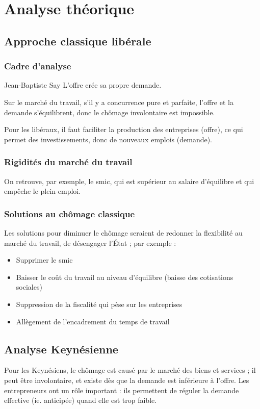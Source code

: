 \documentclass[10pt,a4paper,french]{article}
\begin{document}
\section{Analyse théorique}

\subsection{Approche classique libérale}

\subsubsection{Cadre d'analyse}
\begin{cquote}{Jean-Baptiste Say}
L'offre crée sa propre demande.
\end{cquote}

Sur le marché du travail, s'il y a concurrence pure et parfaite, l'offre et la demande s'équilibrent, donc le chômage involontaire est impossible.

Pour les libéraux, il faut faciliter la production des entreprises (offre), ce qui permet des investissements, donc de nouveaux emplois (demande).

\subsubsection{Rigidités du marché du travail}
On retrouve, par exemple, le \gls{smic}, qui est supérieur au salaire d'équilibre et qui empêche le plein-emploi.

\subsubsection{Solutions au chômage classique}
Les solutions pour diminuer le chômage seraient de redonner la flexibilité au marché du travail, de désengager l’État ; par exemple :
\begin{itemize}
\item Supprimer le \gls{smic}
\item Baisser le coût du travail au niveau d'équilibre (baisse des cotisations sociales)
\item Suppression de la fiscalité qui pèse sur les entreprises
\item Allègement de l'encadrement du temps de travail
\end{itemize}

\subsection{Analyse Keynésienne}
Pour les Keynésiens, le chômage est causé par le marché des biens et services ; il peut être involontaire, et existe dès que la demande est inférieure à l'offre. Les entrepreneurs ont un rôle important : ils permettent de réguler la demande effective (ie. anticipée) quand elle est trop faible.
\end{document}
